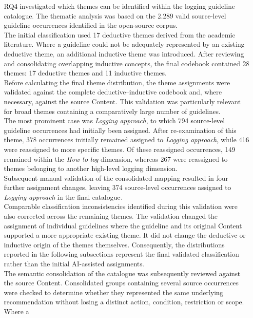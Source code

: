 RQ4 investigated which themes can be identified within the logging guideline
catalogue. The thematic analysis was based on the 2.289 valid source-level
guideline occurrences identified in the open-source corpus.
\\
The initial classification used 17 deductive themes derived from the academic
literature. Where a guideline could not be adequately represented by an existing
deductive theme, an additional inductive theme was introduced. After reviewing and
consolidating overlapping inductive concepts, the final codebook contained 28
themes: 17 deductive themes and 11 inductive themes.
\\
Before calculating the final theme distribution, the theme assignments were
validated against the complete deductive--inductive codebook and, where necessary,
against the source Content. This validation was particularly relevant for
broad themes containing a comparatively large number of guidelines.
\\
The most prominent case was \textit{Logging approach}, to which 794 source-level
guideline occurrences had initially been assigned. After re-examination of this theme,
378 occurrences initially remained assigned to
\textit{Logging approach}, while 416 were reassigned to more specific themes.
Of these reassigned occurrences, 149 remained within the \textit{How to log}
dimension, whereas 267 were reassigned to themes belonging to another high-level
logging dimension.
\\
Subsequent manual validation of the consolidated mapping resulted in four further
assignment changes, leaving 374 source-level occurrences assigned to
\textit{Logging approach} in the final catalogue.
\\
Comparable classification inconsistencies identified during this validation were
also corrected across the remaining themes. The validation changed the assignment
of individual guidelines where the guideline and its original Content supported a
more appropriate existing theme. It did not change the deductive or inductive origin
of the themes themselves. Consequently, the distributions reported in the following
subsections represent the final validated classification rather than the initial
AI-assisted assignments.
\\
The semantic consolidation of the catalogue was subsequently reviewed against the
source Content. Consolidated groups containing several source occurrences were
checked to determine whether they represented the same underlying recommendation
without losing a distinct action, condition, restriction or scope. Where a
